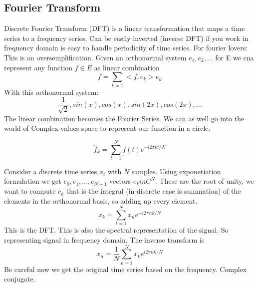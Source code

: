 \documentclass[12pt]{book}
\begin{document}
\subsection{Fourier Transform}
Discrete Fourier Transform (DFT) is a linear transformation that maps a time series to a frequency series. \newline
Can be easily inverted (inverse DFT) if you work in frequency domain is easy to handle periodicity of time series.
For fourier lovers: This is an oversemplification.\newline
Given an orthonormal system ${e_1, e_2,...}$ for E we cna represent any function $f \in E$ as linear combination
\begin{equation}
	f=\sum_{k=1}<f,e_k>e_k
\end{equation}
With this orthonormal system:
\begin{equation}
	{\frac{1}{\sqrt{2}}, sin(x), cos(x), sin(2x), cos(2x),...}
\end{equation}
The linear combination becomes the Fourier Series.
We can as well go into the world of Complex values space to represent our function in a circle.

\begin{equation}
	\hat{f}_k=\sum_{t=1}^N f(t)e^{-i2\pi kt/N}
\end{equation}

Consider a discrete time series $x_t$ with $N$ samples. Using exponetiation formulation we get ${e_0, e_1,...,e_{N-1}}$ vectors $e_k in C^N$.
These are the root of unity, we want to compute $c_k$ that is the integral (in discrete case is summation) of the elements in the orthonormal basis, so adding up every element.
\begin{equation}
	x_k=\sum_{t=1}^N x_n e^{-i2\pi nk/N}
\end{equation}
This is the DFT. \newline
This is also the spectral representation of the signal. \newline
So representing signal in frequency domain.
The inverse transform is
\begin{equation}
	x_n=\frac{1}{N}\sum_{k=1}^N x_k e^{i2\pi nk/N}
\end{equation}
Be careful now we get the original time series based on the frequency. Complex conjugate.
\end{document}
